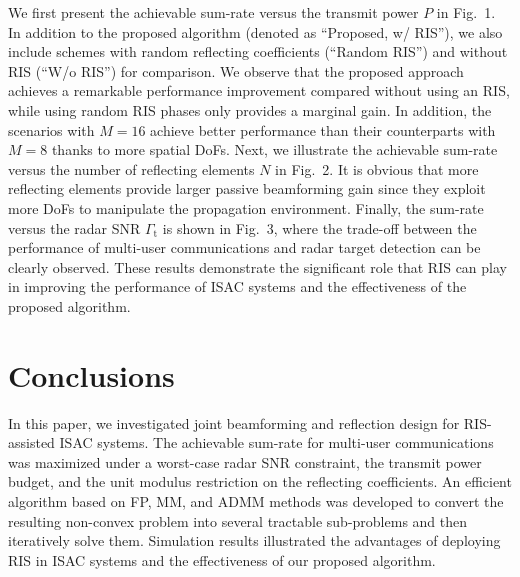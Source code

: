 \documentclass[Conference,a4paper]{IEEEtran}
\begin{document}
We first present the achievable sum-rate versus the transmit power $P$ in Fig.~1.
In addition to the proposed algorithm (denoted as ``Proposed, w/ RIS''), we also include schemes with random reflecting coefficients (``Random RIS'') and without RIS (``W/o RIS'') for comparison.
We observe that the proposed approach achieves a remarkable performance improvement compared without using an RIS, while using random RIS phases only provides a marginal gain.
In addition, the scenarios with $M=16$ achieve better performance than their counterparts with $M=8$ thanks to more spatial DoFs.
Next, we illustrate the achievable sum-rate versus the number of reflecting elements $N$ in Fig.~2.
It is obvious that more reflecting elements provide larger passive beamforming gain since they exploit more DoFs to manipulate the propagation environment.
Finally, the sum-rate versus the radar SNR $\Gamma_\text{t}$ is shown in Fig.~3, where the trade-off between the performance of multi-user communications and radar target detection can be clearly observed.
These results demonstrate the significant role that RIS can play in improving the performance of ISAC systems and the effectiveness of the proposed algorithm.


\section{Conclusions}


In this paper, we investigated joint beamforming and reflection design for RIS-assisted ISAC systems.
The achievable sum-rate for multi-user communications was maximized under a worst-case radar SNR constraint, the transmit power budget, and the unit modulus restriction on the reflecting coefficients.
An efficient algorithm based on FP, MM, and ADMM methods was developed to convert the resulting non-convex problem into several tractable sub-problems and then iteratively solve them.
Simulation results illustrated the advantages of deploying RIS in ISAC systems and the effectiveness of our proposed algorithm.
\end{document}
